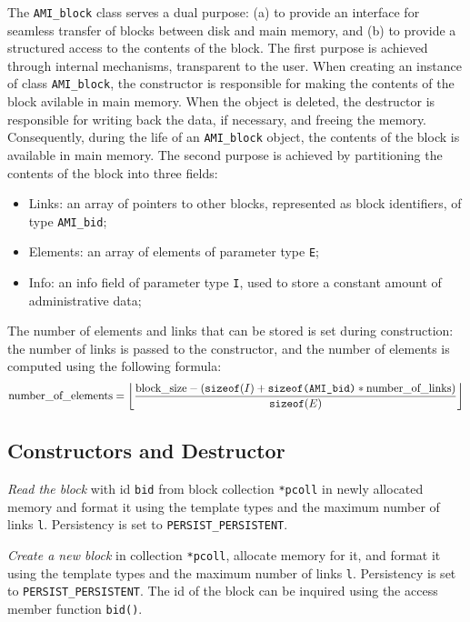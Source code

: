 The \lstinline|AMI_block| class serves a dual purpose: (a) to provide an
interface for seamless transfer of blocks between disk and main memory,
and (b) to provide a structured access to the contents of the block.
The first purpose is achieved through internal mechanisms, transparent
to the user. When creating an instance of class \lstinline|AMI_block|, the
constructor is responsible for making the contents of the block
avilable in main memory. When the object is deleted, the destructor is
responsible for writing back the data, if necessary, and freeing the
memory. Consequently, during the life of an \lstinline|AMI_block| object, the
contents of the block is available in main memory.
The second purpose is achieved by partitioning the contents of the block
into three fields:
\begin{itemize}
\item[] Links: an array of pointers to other blocks, represented as
block identifiers, of type \lstinline|AMI_bid|;
\item[] Elements: an array of elements of parameter type \lstinline|E|;
\item[] Info: an info field of parameter type \lstinline|I|, used to store a 
constant amount of administrative data;
\end{itemize}

The number of elements and links that can be stored is set during
construction: the number of links is passed to the constructor, and the
number of elements is computed using the following formula:
\[\mbox{\rm number\_of\_elements} = \left\lfloor\frac{\mbox{\rm
block\_size} - (\mbox{\tt sizeof}(I) + \mbox{\tt sizeof(AMI\_bid)} *
\mbox{\rm number\_of\_links})}{\mbox{\tt sizeof}(E)}\right\rfloor \]

\subsection{Constructors and Destructor}

   \btabb 

         {{\em Read the block} with id \lstinline|bid| from block collection
        \lstinline|*pcoll| in newly allocated memory and format it using the
        template types and the maximum number of links \lstinline|l|. Persistency
        is set to \lstinline|PERSIST_PERSISTENT|.}

         {{\em
        Create a new block} in collection \lstinline|*pcoll|, allocate memory for
        it, and format it using the template types and the maximum number
        of links \lstinline|l|. Persistency is set to \lstinline|PERSIST_PERSISTENT|. The id of the block can be inquired using the
        access member function \lstinline|bid()|.}


